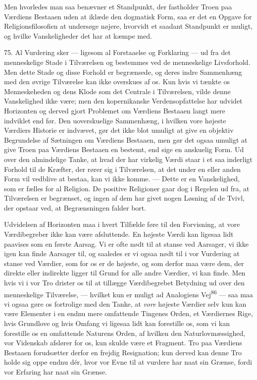 \documentclass[12pt,a4paper,openany]{book}
\newcommand{\opage}[1]{\marginnote{\footnotesize\textit{[#1]}}}
\begin{document}
Men hvorledes man saa benævner et Standpunkt, der fastholder Troen paa
Værdiens Bestaaen uden at iklæde den dogmatisk Form, saa er det en
Opgave for Religionsfilosofien at undersøge nøjere, hvorvidt et saadant
Standpunkt er muligt, og hvilke Vanskeligheder det har at kæmpe med.

75. Al Vurdering sker --- ligesom al Forstaaelse og Forklaring --- ud
fra det menneskelige Stade i Tilværelsen og bestemmes ved de
menneskelige Livsforhold. Men dette Stade og disse Forhold er
begrænsede, og deres indre Sammenhæng med den øvrige Tilværelse kan ikke
overskues af os. Kun hvis vi tænkte os Menneskeheden og dens Klode som
det Centrale i Tilværelsen, vilde denne Vanskelighed ikke være; men den
kopernikanske Verdensopfattelse har udvidet Horizonten og derved gjort
Problemet om Værdiens Bestaaen langt mere indviklet end før. Den
uoverskuelige Sammenhæng, i hvilken vore højeste Værdiers Historie er
indvævet, gør det ikke blot umuligt at give en objektiv Begrundelse af
Sætningen om Værdiens Bestaaen, men gør det ogsaa umuligt at give Troen
paa Værdiens Bestaaen en bestemt, end sige en anskuelig Form. Ud over
den almindelige Tanke, at hvad der har virkelig Værdi staar i et saa
inderligt
\opage{174}Forhold til de Kræfter, der rører sig i Tilværelsen, at det
under en eller anden Form vil vedblive at bestaa, kan vi ikke komme. ---
Dette er en Vanskelighed, som er fælles for al Religion. De positive
Religioner gaar dog i Regelen ud fra, at Tilværelsen er begrænset, og
ingen af dem har givet nogen Løsning af de Tvivl, der opstaar ved, at
Begrænsningen falder bort.

Udvidelsen af Horizonten maa i hvert Tilfælde føre til den Forvisning,
at vore Værdibegreber ikke kan være afsluttende. En højeste Værdi kan
ligesaa lidt paavises som en første Aarsag. Vi er ofte nødt til at
stanse ved Aarsager, vi ikke igen kan finde Aarsager til, og saaledes er
vi ogsaa nødt til i vor Vurdering at stanse ved Værdier, som for os er
de højeste, og som derfor maa være dem, der direkte eller indirekte
ligger til Grund for alle andre Værdier, vi kan finde. Men hvis vi i vor
Tro drister os til at tillægge Værdibegrebet Betydning ud over den
menneskelige Tilværelse, --- hvilket kun er muligt ad Analogiens
Vej\textsuperscript{86} --- saa maa vi ogsaa gøre os fortrolige med den
Tanke, at \textit{vore} højeste Værdier selv kun kan være Elementer i en
endnu mere omfattende Tingenes Orden, et Værdiernes Rige, hvis Grundlove
og hvis Omfang vi ligesaa lidt kan forestille os, som vi kan forestille
os en omfattende Naturens Orden, af hvilken den Naturlovmæssighed, vor
Videnskab afslører for os, kun skulde være et Fragment. Tro paa Værdiens
Bestaaen forudsætter derfor en frejdig Resignation; kun derved kan denne
Tro holde sig oppe endnu dér, hvor vor Evne til at vurdere har naat sin
Grænse, fordi vor Erfaring har naat sin Grænse.
\end{document}
